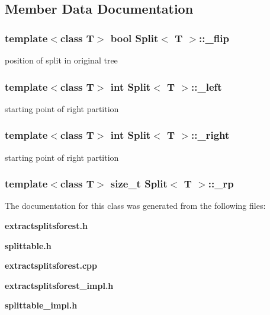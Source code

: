 \subsection{Member Data Documentation}
\subsubsection{\setlength{\rightskip}{0pt plus 5cm}template$<$class T$>$ bool {\bf Split}$<$ T $>$::{\bf \_\-flip}}\label{classSplit_o3}


position of split in original tree 

\subsubsection{\setlength{\rightskip}{0pt plus 5cm}template$<$class T$>$ int {\bf Split}$<$ T $>$::{\bf \_\-left}}\label{classSplit_o1}


starting point of right partition 

\subsubsection{\setlength{\rightskip}{0pt plus 5cm}template$<$class T$>$ int {\bf Split}$<$ T $>$::{\bf \_\-right}}\label{classSplit_o2}


starting point of right partition 

\subsubsection{\setlength{\rightskip}{0pt plus 5cm}template$<$class T$>$ size\_\-t {\bf Split}$<$ T $>$::{\bf \_\-rp}}\label{classSplit_o0}




The documentation for this class was generated from the following files:\begin{CompactItemize}
\item 
{\bf extractsplitsforest.h}\item 
{\bf splittable.h}\item 
{\bf extractsplitsforest.cpp}\item 
{\bf extractsplitsforest\_\-impl.h}\item 
{\bf splittable\_\-impl.h}\end{CompactItemize}
